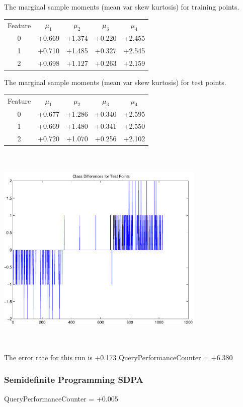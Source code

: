 \documentclass[9pt]{article}
\theoremstyle{plain}
\theoremstyle{definition}
\theoremstyle{remark}
\numberwithin{equation}{section}
\begin{document}
The marginal sample moments (mean var skew kurtosis) for training points.\newline
\begin{tabular}{ c |  c  c  c  c}
Feature & $\mu_1$ & $\mu_2$ & $\mu_3$ & $\mu_4$ \\
0 & +0.669 & +1.374 & +0.220& +2.455 \\
\hline
1 & +0.710 & +1.485 & +0.327& +2.545 \\
\hline
2 & +0.698 & +1.127 & +0.263& +2.159 \\
\hline
\end{tabular}
\newline
The marginal sample moments (mean var skew kurtosis) for test points.\newline
\begin{tabular}{ c | c  c  c  c}
Feature & $\mu_1$ & $\mu_2$ & $\mu_3$ & $\mu_4$ \\
0 & +0.677 & +1.286 & +0.340& +2.595\\
\hline
1 & +0.669 & +1.480 & +0.341& +2.550\\
\hline
2 & +0.720 & +1.070 & +0.256& +2.102\\
\hline
\end{tabular}\newline
\includegraphics[width=10.0cm,height=10.0cm]{classDiffs.pdf}

The error rate for this run is +0.173\newline
QueryPerformanceCounter  =  +6.380
\subsubsection{Semidefinite Programming SDPA}
QueryPerformanceCounter  =  +0.005
\end{document}
